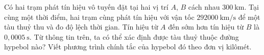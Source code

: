 \begin{bt}%
	Có hai trạm phát tín hiệu vô tuyến đặt tại hai vị trí $A$, $B$ cách nhau $300 \mathrm{~km}$. Tại cùng một thời điểm, hai trạm cùng phát tín hiệu với vận tốc $292000 \mathrm{~km} / \mathrm{s}$ để một tàu thuỷ thu và đo độ lệch thời gian. Tín hiệu từ $A$ đến sớm hơn tín hiệu từ $B$ là $0{,}0005 \mathrm{~s}$. Từ thông tin trên, ta có thể xác định được tàu thuỷ thuộc đường hypebol nào? Viết phương trình chính tắc của hypebol đó theo đơn vị kilômét.
\end{bt}


